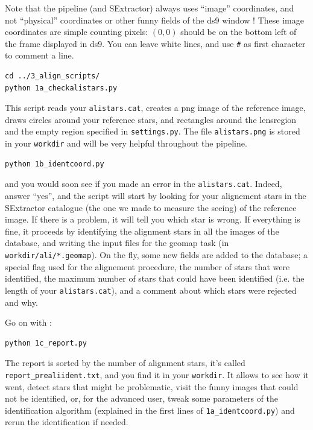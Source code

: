 Note that the pipeline (and SExtractor) always uses ``image'' coordinates, and not ``physical'' coordinates or other funny fields of the ds9 window ! These image coordinates are simple counting pixels: $(0,0)$ should be on the bottom left of the frame displayed in ds9.
You can leave white lines, and use \verb+#+ as first character to comment a line. 

\begin{Verbatim}
cd ../3_align_scripts/
python 1a_checkalistars.py
\end{Verbatim}
This script reads your \verb+alistars.cat+, creates a png image of the reference image, draws circles around your reference stars, and rectangles around the lensregion and the empty region specified in \verb+settings.py+. The file \verb+alistars.png+ is stored in your \verb+workdir+ and will be very helpful throughout the pipeline.

\begin{Verbatim}
python 1b_identcoord.py
\end{Verbatim}
and you would soon see if you made an error in the \verb+alistars.cat+. Indeed, answer ``yes'', and the script will start by looking for your alignement stars in the SExtractor catalogue (the one we made to measure the seeing) of the reference image. If there is a problem, it will tell you which star is wrong. If everything is fine, it proceeds by identifying the alignment stars in all the images of the database, and writing the input files for the geomap task (in \verb+workdir/ali/*.geomap+). On the fly, some new fields are added to the database; a special flag used for the alignement procedure, the number of stars that were identified, the maximum number of stars that could have been identified (i.e. the length of your \verb+alistars.cat+), and a comment about which stars were rejected and why.

Go on with :

\begin{Verbatim}
python 1c_report.py
\end{Verbatim}

The report is sorted by the number of alignment stars, it's called \verb+report_prealiident.txt+, and you find it in your \verb+workdir+. It allows to see how it went, detect stars that might be problematic, visit the funny images that could not be identified, or, for the advanced user, tweak some parameters of the identification algorithm (explained in the first lines of \verb+1a_identcoord.py+) and rerun the identification if needed.


